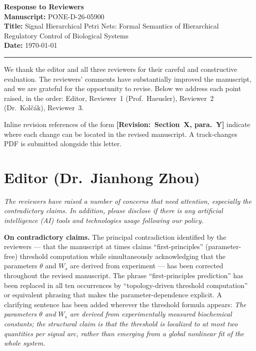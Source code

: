 \documentclass[11pt,letterpaper]{article}
\newcommand{\rquote}[1]{\begin{mdframed}[style=reviewquote]\textit{#1}\end{mdframed}}
\newcommand{\sref}[1]{\textbf{[Revision:~#1]}}
\begin{document}
\textbf{Response to Reviewers}\\
\textbf{Manuscript:} PONE-D-26-05900\\
\textbf{Title:} Signal Hierarchical Petri Nets: Formal Semantics of
Hierarchical Regulatory Control of Biological Systems\\
\textbf{Date:} \today

\bigskip
\hrule
\bigskip

We thank the editor and all three reviewers for their careful and constructive
evaluation. The reviewers' comments have substantially improved the manuscript,
and we are grateful for the opportunity to revise. Below we address each point
raised, in the order: Editor, Reviewer~1 (Prof.\ Haeusler), Reviewer~2
(Dr.\ Kolč{\'a}k), Reviewer~3.

Inline revision references of the form \sref{Section~X, para.~Y} indicate
where each change can be located in the revised manuscript. A track-changes PDF
is submitted alongside this letter.

\bigskip

\section*{Editor (Dr.\ Jianhong Zhou)}

\rquote{The reviewers have raised a number of concerns that need attention,
especially the contradictory claims. In addition, please disclose if there is
any artificial intelligence (AI) tools and technologies usage following our
policy.}

\textbf{On contradictory claims.} The principal contradiction identified by
the reviewers --- that the manuscript at times claims ``first-principles''
(parameter-free) threshold computation while simultaneously acknowledging that
the parameters $\theta$ and $W_s$ are derived from experiment --- has been
corrected throughout the revised manuscript. The phrase
``first-principles prediction'' has been replaced in all ten occurrences by
``topology-driven threshold computation'' or equivalent phrasing that makes the
parameter-dependence explicit. A clarifying sentence has been added wherever
the threshold formula appears: \textit{The parameters $\theta$ and $W_s$ are
derived from experimentally measured biochemical constants; the structural claim
is that the threshold is localized to at most two quantities per signal arc,
rather than emerging from a global nonlinear fit of the whole system.}
\end{document}
